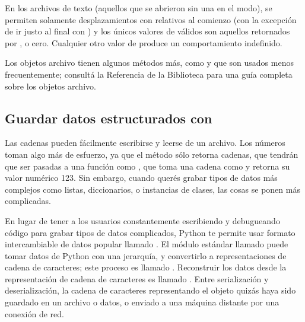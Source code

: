 \documentclass[a4,10pt,spanish]{sphinxmanual}
\begin{document}
\sphinxAtStartPar
En los archivos de texto (aquellos que se abrieron sin una  en el modo), se permiten solamente desplazamientos con  relativos al comienzo (con la excepción de ir justo al final con ) y los únicos valores de  válidos son aquellos retornados por , o cero. Cualquier otro valor de  produce un comportamiento indefinido.

\sphinxAtStartPar
Los objetos archivo tienen algunos métodos más, como  y  que son usados menos frecuentemente; consultá la Referencia de la Biblioteca para una guía completa sobre los objetos archivo.


\subsection{Guardar datos estructurados con }
\label{\detokenize{tutorial/inputoutput:saving-structured-data-with-json}}\label{\detokenize{tutorial/inputoutput:tut-json}}
\ignorespaces 
\sphinxAtStartPar
Las cadenas pueden fácilmente escribirse y leerse de un archivo.  Los números toman algo más de esfuerzo, ya que el método  sólo retorna cadenas, que tendrán que ser pasadas a una función como , que toma una cadena como  y retorna su valor numérico 123.  Sin embargo, cuando querés grabar tipos de datos más complejos como listas, diccionarios, o instancias de clases, las cosas se ponen más complicadas.

\sphinxAtStartPar
En lugar de tener a los usuarios constantemente escribiendo y debugueando código para grabar tipos de datos complicados, Python te permite usar formato intercambiable de datos popular llamado . El módulo estándar llamado  puede tomar datos de Python con una jerarquía, y convertirlo a representaciones de cadena de caracteres; este proceso es llamado . Reconstruir los datos desde la representación de cadena de caracteres es llamado . Entre serialización y deserialización, la cadena de caracteres representando el objeto quizás haya sido guardado en un archivo o datos, o enviado a una máquina distante por una conexión de red.
\end{document}
